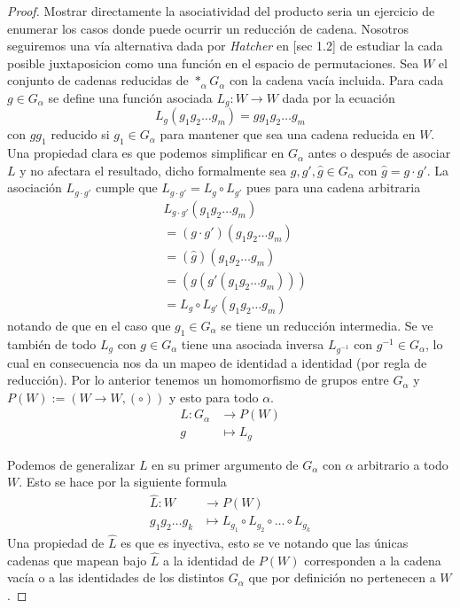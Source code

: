 \begin{proof}
  Mostrar directamente la asociatividad del producto seria un ejercicio
  de enumerar los casos donde puede ocurrir un reducción de cadena.
  Nosotros seguiremos una vía alternativa dada por \emph{Hatcher} en
  \cite{Hatcher}[sec 1.2] de estudiar la cada posible juxtaposicion como
  una función en el espacio de permutaciones. Sea \(W\) el conjunto de
  cadenas reducidas de \(*_\alpha G_\alpha\) con la cadena vacía
  incluida. Para cada \(g \in G_\alpha\) se define una función asociada
  \(L _g : W \to W\) dada por la ecuación
  \[ L_g \left( g_1 g_2 \dots g_m \right) = g g_1 g_2 \dots g_m \]
  con \(g g_1\) reducido si \(g_1 \in G_\alpha \) para mantener que sea
  una cadena reducida en \(W\). Una propiedad clara es que podemos
  simplificar en \(G_\alpha\) antes o después de asociar \(L\) y no
  afectara el resultado, dicho formalmente sea \(g, g', \hat g \in
  G_\alpha\) con \(\hat g = g \cdot g'\). La asociación \(L_{g \cdot
  g'}\) cumple que \(L _{g \cdot g'} = L_{g} \circ L_{g'}\) pues para una
  cadena arbitraria
  \begin{align*}
    &L_{g \cdot g'} \left( g_1 g_2 \dots g_m \right) \\
    &= (g \cdot g') (g_1 g_2 \dots g_m) \\
    &= (\hat g) (g_1 g_2 \dots g_m) \\
    &= (g (g' (g_1 g_2 \dots g_m))) \\
    &= L_g \circ L_{g'} \left( g_1 g_2 \dots g_m \right)
  \end{align*}
  notando de que en el caso que \(g_1 \in G_\alpha\) se tiene un
  reducción intermedia. Se ve también de todo \(L_g\) con \(g \in
  G_\alpha\) tiene una asociada inversa \(L_{g^{-1}}\) con \(g^{-1} \in
  G_\alpha\), lo cual en consecuencia nos da un mapeo de identidad a
  identidad (por regla de reducción). Por lo anterior tenemos un
  homomorfismo de grupos entre \(G_\alpha\) y \(P(W) := (W \to W, (\circ))\) y
  esto para todo \(\alpha\).
  \begin{align*}
    L: G_\alpha &\longrightarrow P(W) \\
    g &\longmapsto L_g
  \end{align*}

  Podemos de generalizar \(L\) en su primer
  argumento de \(G_\alpha\) con \(\alpha\) arbitrario a todo \(W\). Esto
  se hace por la siguiente formula
  \begin{align}
    \hat L : W &\longrightarrow P(W) \nonumber \\
    g_1 g_2 \dots g_k &\longmapsto L_{g_1} \circ L_{g_2} \circ \dots
    \circ L_{g_k} \label{def:hatL}
  \end{align}
  Una propiedad de \(\hat L\) es que es inyectiva, esto se ve notando
  que las únicas cadenas que mapean bajo \(\hat L\) a la identidad de
  \(P (W)\) corresponden a la cadena vacía o a las identidades de los
  distintos \(G_\alpha\) que por definición no pertenecen a \(W\).


\end{proof}
